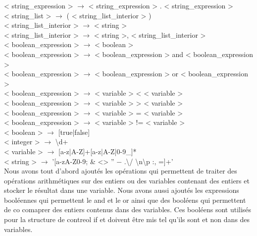 \documentclass[a4paper,10pt]{article}
\begin{document}
{< string\_expression > $\rightarrow$ < string\_expression > . < string\_expression > \\
< string\_list > $\rightarrow$ ( < string\_list\_interior > ) \\
< string\_list\_interior > $\rightarrow$ < string >\\
< string\_list\_interior > $\rightarrow$ < string >, < string\_list\_interior > \\
< boolean\_expression > $\rightarrow$ < boolean > \\
< boolean\_expression > $\rightarrow$ < boolean\_expression > and < boolean\_expression > \\
< boolean\_expression > $\rightarrow$ < boolean\_expression > or < boolean\_expression > \\
< boolean\_expression > $\rightarrow$ < variable > < < variable >\\
< boolean\_expression > $\rightarrow$ < variable > > < variable >\\
< boolean\_expression > $\rightarrow$ < variable > = < variable >\\
< boolean\_expression > $\rightarrow$ < variable > != < variable >\\
< boolean > $\rightarrow$ [true|false]\\
< integer > $\rightarrow$ \textbackslash d+\\
< variable > $\rightarrow$ [a-z|A-Z]+[a-z|A-Z|0-9\_]*\\
< string > $\rightarrow$ '[a-zA-Z0-9; \& <> ” − .\textbackslash / \textbackslash n\textbackslash p :, =]+' \\
}
Nous avons tout d'abord  ajoutés les opérations qui permettent de traiter des opérations arithmétiques sur des entiers ou des variables contenant des entiers et 
stocker le résultat dans une variable. Nous avons aussi ajoutés les expressions booléennes qui permettent le and et le or ainsi que des booléens qui permettent de co
comaprer des entiers contenus dans des variables. Ces booléens sont utilisés pour la structure de contreol if et doivent être mis tel qu'ils sont et non dans 
des variables.
\end{document}
